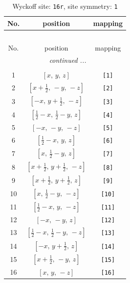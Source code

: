 \documentclass[fleqn,8pt]{jsarticle}
\begin{document}
\begin{longtable}{ccc}
\caption{Wyckoff site: {\tt 16r}, site symmetry: {\tt 1}}
 \\
 \hline \hline
No. & position & mapping \\ \hline \endfirsthead

\multicolumn{2}{l}{\tablename\ \thetable{}} \\
 \hline \hline
No. & position & mapping \\ \hline \endhead

 \hline \hline
\multicolumn{2}{r}{\footnotesize\it continued ...} \\ \endfoot

 \hline \hline
\multicolumn{2}{r}{} \\ \endlastfoot

1 & $\left[ x,\, y,\, z \right]$ & {\tt [1]} \\ \hline
2 & $\left[ x + \frac{1}{2},\, - y,\, - z \right]$ & {\tt [2]} \\ \hline
3 & $\left[ - x,\, y + \frac{1}{2},\, - z \right]$ & {\tt [3]} \\ \hline
4 & $\left[ \frac{1}{2} - x,\, \frac{1}{2} - y,\, z \right]$ & {\tt [4]} \\ \hline
5 & $\left[ - x,\, - y,\, - z \right]$ & {\tt [5]} \\ \hline
6 & $\left[ \frac{1}{2} - x,\, y,\, z \right]$ & {\tt [6]} \\ \hline
7 & $\left[ x,\, \frac{1}{2} - y,\, z \right]$ & {\tt [7]} \\ \hline
8 & $\left[ x + \frac{1}{2},\, y + \frac{1}{2},\, - z \right]$ & {\tt [8]} \\ \hline
9 & $\left[ x + \frac{1}{2},\, y + \frac{1}{2},\, z \right]$ & {\tt [9]} \\ \hline
10 & $\left[ x,\, \frac{1}{2} - y,\, - z \right]$ & {\tt [10]} \\ \hline
11 & $\left[ \frac{1}{2} - x,\, y,\, - z \right]$ & {\tt [11]} \\ \hline
12 & $\left[ - x,\, - y,\, z \right]$ & {\tt [12]} \\ \hline
13 & $\left[ \frac{1}{2} - x,\, \frac{1}{2} - y,\, - z \right]$ & {\tt [13]} \\ \hline
14 & $\left[ - x,\, y + \frac{1}{2},\, z \right]$ & {\tt [14]} \\ \hline
15 & $\left[ x + \frac{1}{2},\, - y,\, z \right]$ & {\tt [15]} \\ \hline
16 & $\left[ x,\, y,\, - z \right]$ & {\tt [16]} \\
\end{longtable}
\end{document}
